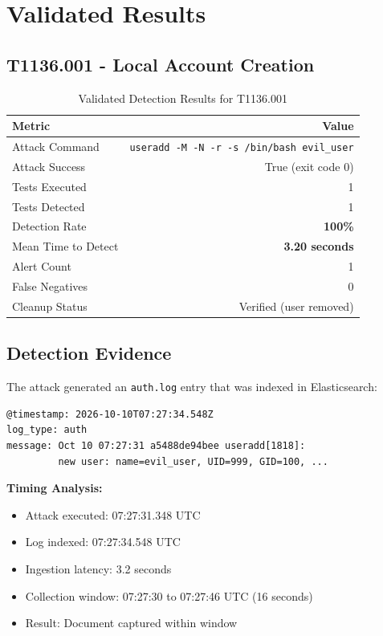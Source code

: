 \documentclass[11pt,a4paper]{article}
\begin{document}
\section{Validated Results}

\subsection{T1136.001 - Local Account Creation}

\begin{table}[H]
    \centering
    \caption{Validated Detection Results for T1136.001}
    \begin{tabular}{lr}
        \toprule
        \textbf{Metric} & \textbf{Value} \\
        \midrule
        Attack Command & \texttt{useradd -M -N -r -s /bin/bash evil\_user} \\
        Attack Success & True (exit code 0) \\
        Tests Executed & 1 \\
        Tests Detected & 1 \\
        Detection Rate & \textbf{100\%} \\
        Mean Time to Detect & \textbf{3.20 seconds} \\
        Alert Count & 1 \\
        False Negatives & 0 \\
        Cleanup Status & Verified (user removed) \\
        \bottomrule
    \end{tabular}
\end{table}

\subsection{Detection Evidence}

The attack generated an \texttt{auth.log} entry that was indexed in Elasticsearch:

\begin{verbatim}
@timestamp: 2026-10-10T07:27:34.548Z
log_type: auth
message: Oct 10 07:27:31 a5488de94bee useradd[1818]:
         new user: name=evil_user, UID=999, GID=100, ...
\end{verbatim}

\textbf{Timing Analysis:}
\begin{itemize}
    \item Attack executed: 07:27:31.348 UTC
    \item Log indexed: 07:27:34.548 UTC
    \item Ingestion latency: 3.2 seconds
    \item Collection window: 07:27:30 to 07:27:46 UTC (16 seconds)
    \item Result: Document captured within window
\end{itemize}
\end{document}
